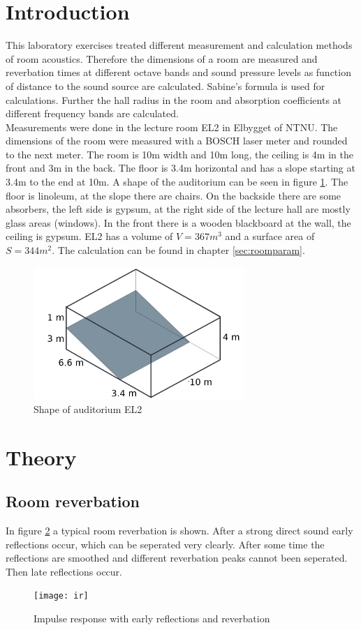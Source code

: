 \documentclass{article}
\begin{document}
\section{Introduction}
This laboratory exercises treated different measurement and calculation methods of room acoustics. Therefore the dimensions of a room are measured and reverbation times at different octave bands and sound pressure levels as function of distance to the sound source are calculated. Sabine's formula is used for calculations. Further the hall radius in the room and absorption coefficients at different frequency bands are calculated.\\
Measurements were done in the lecture room EL2 in Elbygget of NTNU. The dimensions of the room were measured with a BOSCH laser meter and rounded to the next meter. The room is 10m width and 10m long, the ceiling is 4m in the front and 3m in the back. The floor is 3.4m horizontal and has a slope starting at 3.4m to the end at 10m. A shape of the auditorium can be seen in figure \ref{fig:shape}. The floor is linoleum, at the slope there are chairs. On the backside there are some absorbers, the left side is gypsum, at the right side of the lecture hall are mostly glass areas (windows). In the front there is a wooden blackboard at the wall, the ceiling is gypsum. EL2 has a volume of $V=367m^3$ and a surface area of $S=344m^2$. The calculation can be found in chapter \ref{sec:roomparam}.
\begin{figure}[htbp]
\begin{center}
\includegraphics[width=8cm,keepaspectratio=true]{roomshape}
\caption{Shape of auditorium EL2}
\label{fig:shape}
\end{center}
\end{figure}
\section{Theory}
\subsection{Room reverbation}
In figure \ref{fig:irtheory} a typical room reverbation is shown. After a strong direct sound early reflections occur, which can be seperated very clearly. After some time the reflections are smoothed and different reverbation peaks cannot been seperated. Then late reflections occur. 
\begin{figure}[htbp]
\begin{center}
\texttt{[image: ir]}
\caption{Impulse response with early reflections and reverbation}
\label{fig:irtheory}
\end{center}
\end{figure}
\end{document}

